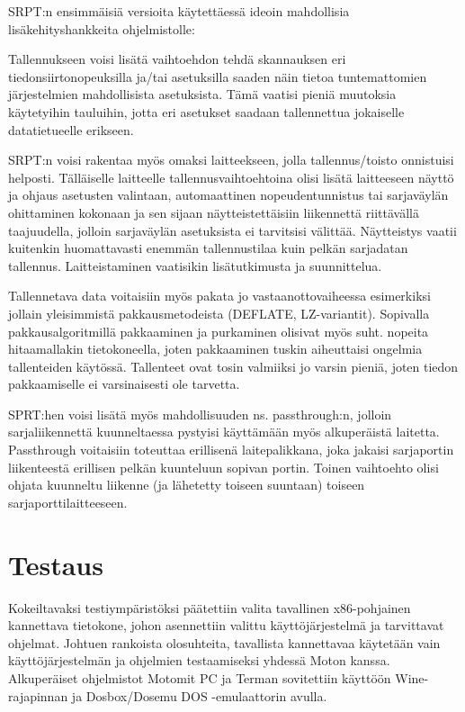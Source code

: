 SRPT:n ensimmäisiä versioita käytettäessä ideoin mahdollisia lisäkehityshankkeita ohjelmistolle:

Tallennukseen voisi lisätä vaihtoehdon tehdä skannauksen eri tiedonsiirtonopeuksilla ja/tai asetuksilla saaden näin tietoa tuntemattomien järjestelmien mahdollisista asetuksista. Tämä vaatisi pieniä muutoksia käytetyihin tauluihin, jotta eri asetukset saadaan tallennettua jokaiselle datatietueelle erikseen.

SRPT:n voisi rakentaa myös omaksi laitteekseen, jolla tallennus/toisto onnistuisi helposti. Tälläiselle laitteelle tallennusvaihtoehtoina olisi lisätä laitteeseen näyttö ja ohjaus asetusten valintaan, automaattinen nopeudentunnistus tai sarjaväylän ohittaminen kokonaan ja sen sijaan näytteistettäisiin liikennettä riittävällä taajuudella, jolloin sarjaväylän asetuksista ei tarvitsisi välittää. Näytteistys vaatii kuitenkin huomattavasti enemmän tallennustilaa kuin pelkän sarjadatan tallennus. Laitteistaminen vaatisikin lisätutkimusta ja suunnittelua.

Tallennetava data voitaisiin myös pakata jo vastaanottovaiheessa esimerkiksi jollain yleisimmistä pakkausmetodeista (DEFLATE, LZ-variantit). Sopivalla pakkausalgoritmillä pakkaaminen ja purkaminen olisivat myös suht. nopeita hitaamallakin tietokoneella, joten pakkaaminen tuskin aiheuttaisi ongelmia tallenteiden käytössä. Tallenteet ovat tosin valmiiksi jo varsin pieniä, joten tiedon pakkaamiselle ei varsinaisesti ole tarvetta.

SPRT:hen voisi lisätä myös mahdollisuuden ns. passthrough:n, jolloin sarjaliikennettä kuunneltaessa pystyisi käyttämään myös alkuperäistä laitetta. Passthrough voitaisiin toteuttaa erillisenä laitepalikkana, joka jakaisi sarjaportin liikenteestä erillisen pelkän kuunteluun sopivan portin. Toinen vaihtoehto olisi ohjata kuunneltu liikenne (ja lähetetty toiseen suuntaan) toiseen sarjaporttilaitteeseen.

\section{Testaus}
Kokeiltavaksi testiympäristöksi päätettiin valita tavallinen x86-pohjainen kannettava tietokone, johon asennettiin valittu käyttöjärjestelmä ja tarvittavat ohjelmat. Johtuen rankoista olosuhteita, tavallista kannettavaa käytetään vain käyttöjärjestelmän ja ohjelmien testaamiseksi yhdessä Moton kanssa. Alkuperäiset ohjelmistot Motomit PC ja Terman sovitettiin käyttöön Wine-rajapinnan ja Dosbox/Dosemu DOS -emulaattorin avulla.

